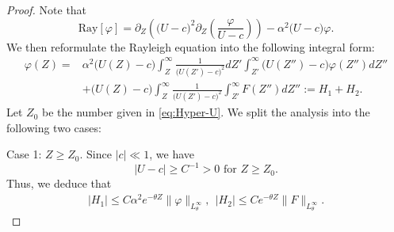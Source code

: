\documentclass[reqno,11pt]{amsart}
\numberwithin{equation}{section}
\numberwithin{equation}{section}
\theoremstyle{plain}
\begin{document}
\begin{proof} Note that 
	$$\mathrm{Ray}[\varphi]=\partial_Z\left(\big(U-c\big)^2\partial_Z\left(\frac{\varphi}{U-c}\right)\right)-\alpha^2\big(U-c\big)\varphi.
	$$
	We then
	reformulate the Rayleigh equation into the following integral form:
	\begin{align}\label{bc1.1}
		\varphi(Z)=&\alpha^2\big(U(Z)-c\big)\int_Z^\infty \frac{1}{\big(U(Z')-c\big)^2} dZ'\int_{Z'}^\infty \big(U(Z'')-c\big)\varphi(Z'')dZ''\nonumber\\
		&+\big(U(Z)-c\big)\int_{Z}^\infty \frac{1}{\big(U(Z')-c\big)^2}\int_{Z'}^\infty F(Z'') dZ'':=H_1+H_2.
	\end{align}
Let $Z_0$ be the number given in \eqref{eq:Hyper-U}. We split the analysis into the following two cases:
	
	Case 1: $Z\geq Z_0$. Since $|c|\ll1$, we have
	$$|U-c|\geq C^{-1}>0 \text{ for } Z\geq Z_0.$$ Thus,
	 we deduce that
	\begin{align}
		|H_1|\leq C\alpha^2e^{-\theta Z}\|\varphi\|_{L^\infty_\theta},~~|H_2|\leq Ce^{-\theta Z}\|F\|_{L^\infty_{\theta}}.\nonumber
	\end{align}


\end{proof}
\end{document}
